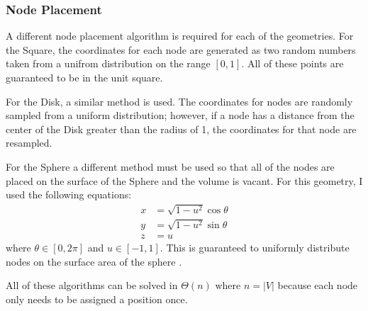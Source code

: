 \documentclass{article}
\begin{document}
        \subsubsection{Node Placement}
        A different node placement algorithm is required for each of the geometries. For the Square, the coordinates for each node are generated as two random numbers taken from a unifrom distribution on the range $[0,1]$. All of these points are guaranteed to be in the unit square.
        \par
        For the Disk, a similar method is used. The coordinates for nodes are randomly sampled from a uniform distribution; however, if a node has a distance from the center of the Disk greater than the radius of 1, the coordinates for that node are resampled.
        \par
        For the Sphere a different method must be used so that all of the nodes are placed on the surface of the Sphere and the volume is vacant. For this geometry, I used the following equations:
        \begin{align}
            x &= \sqrt{1-u^2}\cos\theta \\
            y &= \sqrt{1-u^2}\sin\theta \\
            z &= u
        \end{align}
        where $\theta \in [0,2\pi]$ and $u \in [-1,1]$. This is guaranteed to uniformly distribute nodes on the surface area of the sphere \cite{spherepoints}.
        \par
        All of these algorithms can be solved in $\Theta\left(n\right)$ where $n = |V|$ because each node only needs to be assigned a position once.
\end{document}
